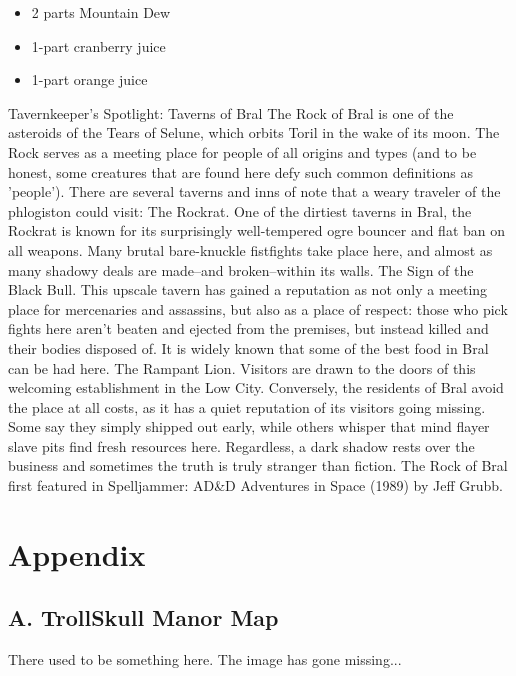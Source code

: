 \documentclass[10pt,a4paper,twoside,twocolumn,openany,bg=print,nodeprecatedcode]{dndbook}
\begin{document}
\begin{itemize}
\paragraph{Ingredients:}
\item 2 parts Mountain Dew
\item 1-part cranberry juice
\item 1-part orange juice
\end{itemize}

\begin{DndComment}{Tavernkeeper's Spotlight: Taverns of Bral}
The Rock of Bral is one of the asteroids of the Tears of Selune, which orbits Toril in the wake of its moon. The Rock serves as a meeting place for people of all origins and types (and to be honest, some creatures that are found here defy such common definitions as 'people'). There are several taverns and inns of note that a weary traveler of the phlogiston could visit:
The Rockrat. One of the dirtiest taverns in Bral, the Rockrat is known for its surprisingly well-tempered ogre bouncer and flat ban on all weapons. Many brutal bare-knuckle fistfights take place here, and almost as many shadowy deals are made–and broken–within its walls.
The Sign of the Black Bull. This upscale tavern has gained a reputation as not only a meeting place for mercenaries and assassins, but also as a place of respect: those who pick fights here aren't beaten and ejected from the premises, but instead killed and their bodies disposed of. It is widely known that some of the best food in Bral can be had here.
The Rampant Lion. Visitors are drawn to the doors of this welcoming establishment in the Low City. Conversely, the residents of Bral avoid the place at all costs, as it has a quiet reputation of its visitors going missing. Some say they simply shipped out early, while others whisper that mind flayer slave pits find fresh resources here. Regardless, a dark shadow rests over the business and sometimes the truth is truly stranger than fiction.
The Rock of Bral first featured in Spelljammer: AD\&D Adventures in Space (1989) by Jeff Grubb.
\end{DndComment}

\appendix
\chapter{Appendix}
\section{A. TrollSkull Manor Map}
There used to be something here. The image has gone missing...
\end{document}
